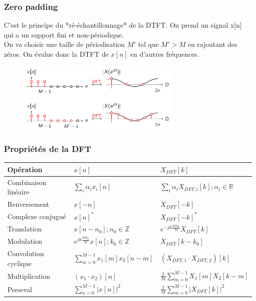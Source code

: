 \documentclass{report}
\begin{document}
\subsubsection{Zero padding}
C'est le principe du *ré-échantillonnage* de la DTFT. On prend un signal x[n] qui a un support fini et non-périodique.\\
On va choisir une taille de périodisation $M'$ tel que $M'>M$ en rajoutant des zéros. On évalue donc la DTFT de $x[n]$ en d'autres fréquences.
\begin{figure}[H]
\centering
\includegraphics[width=8cm]{img/zero.png}
\end{figure}

\subsubsection{Propriétés de la DFT}

\begin{center}
\begin{tabular}{| m{2cm} | m{3cm} | m{4cm} |}
\hline
Opération &$x[n]$& $X_{DFT}[k]$\\
\hline
Combinaison linéaire & $\sum_i \alpha_i x_i[n]$ & $\sum_i \alpha_i X_{DFT,i} [k]; \alpha_i \in \mathbb{R}$ \\
\hline
Renversement & $x[-n]$ & $X_{DFT}[-k]$ \\
\hline
Complexe conjugué & $x[n]^{\ast}$ & $X_{DFT}[-k]^{\ast}$\\
\hline
Translation & $x[n-n_0]; n_0 \in \mathbb{Z}$ & $e^{-jk\frac{2\pi n_0}{M}}X_{DFT}[k]$ \\
\hline
Modulation & $e^{jk\frac{2\pi k_0}{M}}x[n]; k_0 \in \mathbb{Z}$ & $X_{DFT}[k-k_0]$ \\
\hline
Convolution cyclique & $\sum_{m=0}^{M-1}x_1[m]x_2[n-m]$ & $(X_{DFT,1}\cdot X_{DFT,2})[k]$ \\
\hline
Multiplication & $(x_1 \cdot x_2)[n]$ & $\frac{1}{M} \sum_{m=0}^{M-1} X_1[m]X_2[k-m]$ \\
\hline
Perseval & $\sum_{n=0}^{M-1} |x[n]|^2$ & $\frac{1}{M}\sum_{m=0}^{M-1}|X_{DFT}[k]|^2$ \\
\hline
\end{tabular}
\end{center}
\end{document}
